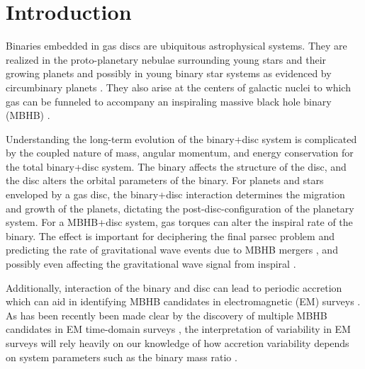 \section{Introduction}
Binaries embedded in gas discs are ubiquitous astrophysical systems. They are realized in the proto-planetary nebulae surrounding young stars and their growing planets \citep{KleyNelson:2012:rev} and possibly in young binary star systems as evidenced by circumbinary planets \citep[\textit{e.g.}][]{ Orosz:2012Sci}. They also arise at the centers of galactic nuclei to which gas can be funneled to accompany an inspiraling massive black hole binary (MBHB) \citep[][and see recent reviews by \cite{Dotti:2012:rev,Mayer:2013:MBHBGasRev}]{Barnes:1996}. 


Understanding the long-term evolution of the binary+disc system is
complicated by the coupled nature of mass, angular momentum, and energy
conservation for the total binary+disc system. The binary affects the
structure of the disc, and the disc alters the orbital parameters of
the binary. For planets and stars enveloped by a gas disc, the
binary+disc interaction determines the migration and growth of the
planets, dictating the post-disc-configuration of the planetary
system. For a MBHB+disc system, gas torques can alter the inspiral
rate of the binary. The effect is important for deciphering the final
parsec problem and predicting the rate of gravitational wave events
due to MBHB mergers \citep{Begel:Blan:Rees:1980, GouldRix:2000,
  ArmNat:2002:ApJL, ArmNat:2005}, and possibly even affecting the
gravitational wave signal from inspiral \citep[D'Orazio et al., {\em in preparation};][]{YKH:2011:L, KocsisYunesLoeb:2011}.

Additionally, interaction of the binary and disc can lead to periodic accretion \citep{Hayasaki:2007, MacFadyen:2008, Cuadra:2009, Roedig:2011:eccevo, Noble+2012,ShiKrolik:2012, Roedig:2012:Trqs, DHM:2013:MNRAS, Farris:2014, Dunhill+2015, ShiKrolik:2015} which can aid in identifying MBHB candidates in electromagnetic (EM) surveys \citep{HKM09}. As has been recently been made clear by the discovery of multiple MBHB candidates in EM time-domain surveys \citep{Graham+2015a, Graham+2015b, Liu:7RsMBHB:2015}, the interpretation of variability in EM surveys will rely heavily on our knowledge of how accretion variability depends on system parameters such as the binary mass ratio \citep[see \textit{e.g.}][]{PG1302MNRAS:2015a,PG1302Nature:2015b}.                                                                                                                                                                                                                                                                                                                                                                                                                                                                                                                                                                                                                                 


